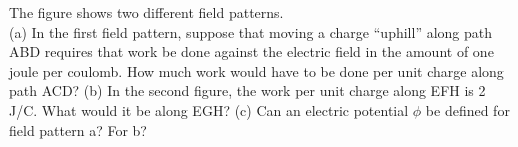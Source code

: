 The figure shows two different field patterns.\\
(a) In the first field pattern,
suppose that moving a charge ``uphill'' along path ABD requires that work be done against
the electric field in the amount of one joule per coulomb. How much work would have to
be done per unit charge along path ACD?\answercheck\hwendpart
(b) In the second figure, the work per unit charge along EFH is 2 J/C. What would it
be along EGH?\answercheck\hwendpart
(c) Can an electric potential $\phi$ be defined for field pattern a? For b?

